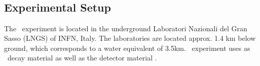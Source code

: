 \documentclass[encoding=utf8,british]{tumphthesis}
\begin{document}


 


\section{\gerda\ \PII}
\label{sec:gerda}


\subsection{Experimental Setup}
\label{sec:ExSetup}
The \gerda\ experiment is located in the underground Laboratori Nazionali del Gran Sasso (LNGS) of INFN, Italy.
The laboratories are located approx. 1.4 km below ground, which corresponds to a water equivalent of 3.5km.
\gerda\ experiment uses  as \onbb\ decay material as well as the detector material \cite{agostini_background_2017}.
\\
\end{document}
